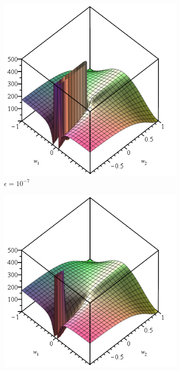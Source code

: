\begin{figure}[H]
\centering
\begin{subfigure}{.33\textwidth}
  \centering
  \includegraphics[width=\linewidth]{graphics/nac-mul-eps-1em7.png}
  \caption{$\epsilon = 10^{-7}$}
\end{subfigure}%
\begin{subfigure}{.33\textwidth}
  \centering
  \includegraphics[width=\linewidth]{graphics/nac-mul-eps-1em1.png}

\end{subfigure}
\end{figure}
